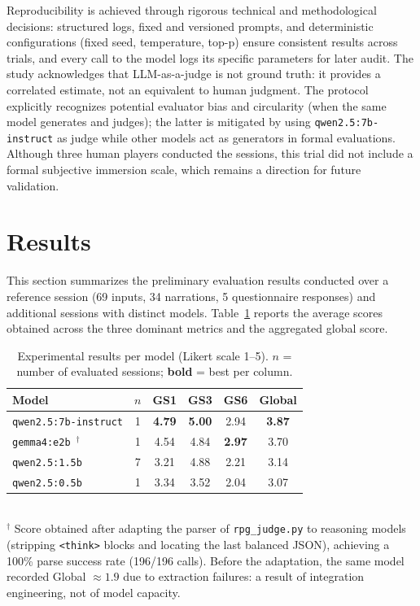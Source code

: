 \documentclass[12pt]{article}
\begin{document}
Reproducibility is achieved through rigorous technical and methodological decisions: structured logs, fixed and versioned prompts, and deterministic configurations (fixed seed, temperature, top-p) ensure consistent results across trials, and every call to the model logs its specific parameters for later audit. The study acknowledges that LLM-as-a-judge is not ground truth: it provides a correlated estimate, not an equivalent to human judgment. The protocol explicitly recognizes potential evaluator bias and circularity (when the same model generates and judges); the latter is mitigated by using \texttt{qwen2.5:7b-instruct} as judge while other models act as generators in formal evaluations. Although three human players conducted the sessions, this trial did not include a formal subjective immersion scale, which remains a direction for future validation.

\section{Results}
\label{sec:results}

This section summarizes the preliminary evaluation results conducted over a reference session (69 inputs, 34 narrations, 5 questionnaire responses) and additional sessions with distinct models. Table~\ref{tab:results} reports the average scores obtained across the three dominant metrics and the aggregated global score.

\begin{table}[ht]
\centering
\caption{Experimental results per model (Likert scale 1--5). $n$ = number of evaluated sessions; \textbf{bold} = best per column.}
\label{tab:results}
\small
\begin{tabular}{lccccc}
\toprule
\textbf{Model} & $n$ & \textbf{GS1} & \textbf{GS3} & \textbf{GS6} & \textbf{Global} \\
\midrule
\texttt{qwen2.5:7b-instruct}                           & 1 & \textbf{4.79} & \textbf{5.00} & 2.94          & \textbf{3.87} \\
\texttt{gemma4:e2b}~$^{\dagger}$ \cite{deepmind:gemma4:2026} & 1 & 4.54          & 4.84          & \textbf{2.97} & 3.70          \\
\texttt{qwen2.5:1.5b}                                  & 7 & 3.21          & 4.88          & 2.21          & 3.14          \\
\texttt{qwen2.5:0.5b}                                  & 1 & 3.34          & 3.52          & 2.04          & 3.07          \\
\bottomrule
\end{tabular}
\\[2pt]
{\footnotesize $^{\dagger}$ Score obtained after adapting the parser of \texttt{rpg\_judge.py} to reasoning models (stripping \texttt{<think>} blocks and locating the last balanced JSON), achieving a 100\% parse success rate (196/196 calls). Before the adaptation, the same model recorded Global $\approx 1.9$ due to extraction failures: a result of integration engineering, not of model capacity.}
\end{table}
\end{document}
